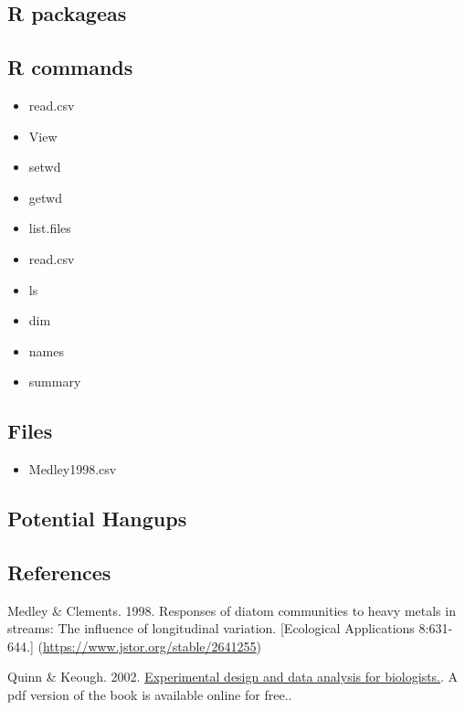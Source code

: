 \documentclass[]{book}
\providecommand{\tightlist}{%
  \setlength{\itemsep}{0pt}\setlength{\parskip}{0pt}}
\theoremstyle{definition}
\theoremstyle{definition}
\theoremstyle{definition}
\theoremstyle{remark}
\begin{document}
\subsection{R packageas}\label{r-packageas}

\subsection{R commands}\label{r-commands-1}

\begin{itemize}
\tightlist
\item
  read.csv
\item
  View
\item
  setwd
\item
  getwd
\item
  list.files
\item
  read.csv
\item
  ls
\item
  dim
\item
  names
\item
  summary
\end{itemize}

\subsection{Files}\label{files}

\begin{itemize}
\tightlist
\item
  Medley1998.csv
\end{itemize}

\subsection{Potential Hangups}\label{potential-hangups-3}

\subsection{References}\label{references}

Medley \& Clements. 1998. Responses of diatom communities to heavy
metals in streams: The influence of longitudinal variation.
{[}Ecological Applications 8:631-644.{]}
(\url{https://www.jstor.org/stable/2641255})

Quinn \& Keough. 2002.
\href{http://www.cambridge.org/us/academic/subjects/life-sciences/ecology-and-conservation/experimental-design-and-data-analysis-biologists?format=PB\&isbn=9780521009768\#1HKJ7hG4zeY15ipR.97}{Experimental
design and data analysis for biologists.}. A pdf version of the book is
available online for free..
\end{document}
